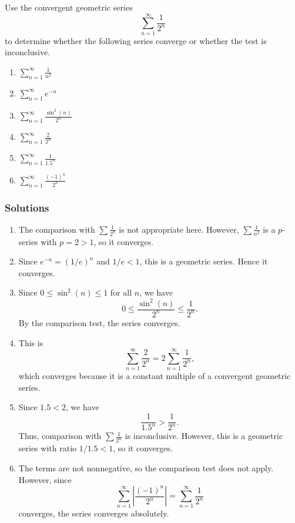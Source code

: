 Use the convergent geometric series
\[
\sum_{n=1}^{\infty} \frac{1}{2^n}
\]
to determine whether the following series converge or whether the test is inconclusive.

\begin{enumerate}
\item $\displaystyle \sum_{n=1}^{\infty} \frac{1}{n^2}$
\item $\displaystyle \sum_{n=1}^{\infty} e^{-n}$
\item $\displaystyle \sum_{n=1}^{\infty} \frac{\sin^2(n)}{2^n}$
\item $\displaystyle \sum_{n=1}^{\infty} \frac{2}{2^n}$
\item $\displaystyle \sum_{n=1}^{\infty} \frac{1}{1.5^n}$
\item $\displaystyle \sum_{n=1}^{\infty} \frac{(-1)^n}{2^n}$
\end{enumerate}

\subsubsection{Solutions}
\label{sss:solu-8692}

\begin{enumerate}

\item The comparison with $\sum \frac{1}{2^n}$ is not appropriate here. 
However, $\sum \frac{1}{n^2}$ is a $p$-series with $p=2>1$, so it converges.

\item Since $e^{-n} = (1/e)^n$ and $1/e < 1$, this is a geometric series. 
Hence it converges.

\item Since $0 \leq \sin^2(n) \leq 1$ for all $n$, we have
\[
0 \leq \frac{\sin^2(n)}{2^n} \leq \frac{1}{2^n}.
\]
By the comparison test, the series converges.

\item This is
\[
\sum_{n=1}^{\infty} \frac{2}{2^n}
= 2 \sum_{n=1}^{\infty} \frac{1}{2^n},
\]
which converges because it is a constant multiple of a convergent geometric series.

\item Since $1.5 < 2$, we have
\[
\frac{1}{1.5^n} > \frac{1}{2^n}.
\]
Thus, comparison with $\sum \frac{1}{2^n}$ is inconclusive. However, this is a geometric series with ratio $1/1.5 < 1$, so it converges.

\item The terms are not nonnegative, so the comparison test does not apply. 
However, since
\[
\sum_{n=1}^{\infty} \left|\frac{(-1)^n}{2^n}\right| = \sum_{n=1}^{\infty} \frac{1}{2^n}
\]
converges, the series converges absolutely.

\end{enumerate}



